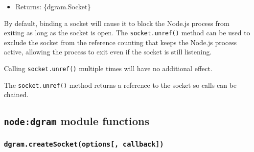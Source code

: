 \begin{itemize}
\tightlist
\item
  Returns: \{dgram.Socket\}
\end{itemize}

By default, binding a socket will cause it to block the Node.js process
from exiting as long as the socket is open. The \texttt{socket.unref()}
method can be used to exclude the socket from the reference counting
that keeps the Node.js process active, allowing the process to exit even
if the socket is still listening.

Calling \texttt{socket.unref()} multiple times will have no additional
effect.

The \texttt{socket.unref()} method returns a reference to the socket so
calls can be chained.

\subsection{\texorpdfstring{\texttt{node:dgram} module
functions}{node:dgram module functions}}\label{nodedgram-module-functions}

\subsubsection{\texorpdfstring{\texttt{dgram.createSocket(options{[},\ callback{]})}}{dgram.createSocket(options{[}, callback{]})}}\label{dgram.createsocketoptions-callback}

